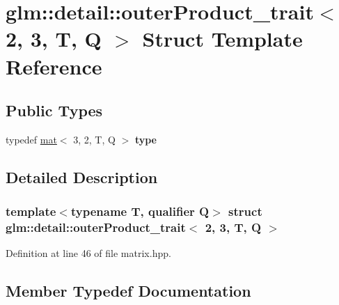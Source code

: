 \hypertarget{structglm_1_1detail_1_1outerProduct__trait_3_012_00_013_00_01T_00_01Q_01_4}{}\section{glm\+:\+:detail\+:\+:outer\+Product\+\_\+trait$<$ 2, 3, T, Q $>$ Struct Template Reference}
\label{structglm_1_1detail_1_1outerProduct__trait_3_012_00_013_00_01T_00_01Q_01_4}
\subsection*{Public Types}
\begin{DoxyCompactItemize}
\item 
\mbox{\label{structglm_1_1detail_1_1outerProduct__trait_3_012_00_013_00_01T_00_01Q_01_4_aed11936b8908e00c2e53b98ab9dedd52}} 
typedef \hyperlink{structglm_1_1mat}{mat}$<$ 3, 2, T, Q $>$ {\bfseries type}
\end{DoxyCompactItemize}


\subsection{Detailed Description}
\subsubsection*{template$<$typename T, qualifier Q$>$\newline
struct glm\+::detail\+::outer\+Product\+\_\+trait$<$ 2, 3, T, Q $>$}



Definition at line 46 of file matrix.\+hpp.



\subsection{Member Typedef Documentation}
\mbox{\label{structglm_1_1detail_1_1outerProduct__trait_3_012_00_013_00_01T_00_01Q_01_4_aed11936b8908e00c2e53b98ab9dedd52}} 
